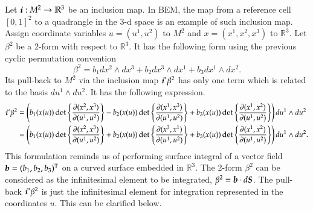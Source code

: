 \documentclass[11pt, a4paper]{book}
\begin{document}
\begin{Example}
  Let $\boldsymbol{i}: M^2 \rightarrow \mathbb{R}^3$ be an inclusion map. In BEM, the map from a
  reference cell $[0,1]^2$ to a quadrangle in the 3-d space is an example of such
  inclusion map. Assign coordinate variables $u = (u^1,u^2)$ to $M^2$ and
  $x = (x^1,x^2,x^3)$ to $\mathbb{R}^3$. Let $\beta^2$ be a 2-form with respect to
  $\mathbb{R}^3$. It has the following form using the previous cyclic permutation
  convention
  \begin{equation*}
    \beta^2 = b_1 dx^2 \wedge dx^3 + b_2 dx^3 \wedge dx^1 + b_3 dx^1 \wedge dx^2.
  \end{equation*}
  Its pull-back to $M^2$ via the inclusion map $\boldsymbol{i}^{*}\beta^2$ has only one term
  which is related to the basis $du^1 \wedge du^2$. It has the following expression.
  \begin{align*}
    \boldsymbol{i}^{*}\beta^2
    &= \left( b_1(x(u)) \det \left\{ \frac{\partial (x^2, x^3)}{\partial (u^1,u^2)} \right\} -
      b_2(x(u)) \det \left\{ \frac{\partial (x^1,x^3)}{\partial (u^1,u^2)} \right\} +
      b_3(x(u)) \det \left\{ \frac{\partial (x^1,x^2)}{\partial (u^1,u^2)} \right\} \right)
      du^1 \wedge du^2 \\
    &= \left( b_1(x(u)) \det \left\{ \frac{\partial (x^2, x^3)}{\partial (u^1,u^2)} \right\} +
      b_2(x(u)) \det \left\{ \frac{\partial (x^3,x^1)}{\partial (u^1,u^2)} \right\} +
      b_3(x(u)) \det \left\{ \frac{\partial (x^1,x^2)}{\partial (u^1,u^2)} \right\} \right)
      du^1 \wedge du^2.
  \end{align*}
  This formulation reminds us of performing surface integral of a vector field
  $\boldsymbol{b} = (b_1,b_2,b_3)^{\mathrm{T}}$ on a curved surface embedded in $\mathbb{R}^3$.
  The 2-form $\beta^2$ can be considered as the infinitesimal element to be integrated,
  $\beta^2 = \boldsymbol{b} \cdot d \boldsymbol{S}$. The pull-back $\boldsymbol{i}^{*}\beta^2$ is just the
  infinitesimal element for integration represented in the coordinates $u$. This can be
  clarified below.


\end{Example}
\end{document}

